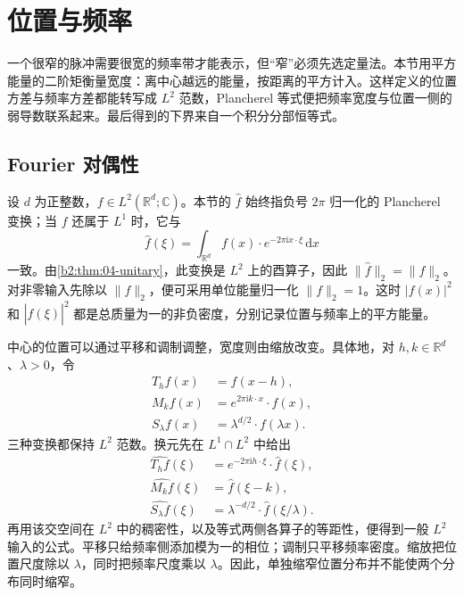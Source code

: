 \section{位置与频率}
\label{b2:sec:2001}

一个很窄的脉冲需要很宽的频率带才能表示，但“窄”必须先选定量法。本节用平方能量的二阶矩衡量宽度：离中心越远的能量，按距离的平方计入。这样定义的位置方差与频率方差都能转写成 \(L^2\) 范数，Plancherel 等式便把频率宽度与位置一侧的弱导数联系起来。最后得到的下界来自一个积分分部恒等式。

\subsection{Fourier 对偶性}
\label{b2:subsec:200101}

设 \(d\) 为正整数，\(f\in L^2(\mathbb R^d;\mathbb C)\)。本节的 \(\widehat f\) 始终指负号 \(2\pi\) 归一化的 Plancherel 变换；当 \(f\) 还属于 \(L^1\) 时，它与
\[
 \widehat f(\xi)
 =\int_{\mathbb R^d}f(x)\cdot e^{-2\pi\mathrm i x\cdot\xi}\,\mathrm dx
\]
一致。由\cref{b2:thm:04-unitary}，此变换是 \(L^2\) 上的酉算子，因此 \(\|\widehat f\|_2=\|f\|_2\)。对非零输入先除以 \(\|f\|_2\)，便可采用单位能量归一化 \(\|f\|_2=1\)。这时 \(|f(x)|^2\) 和 \(|\widehat f(\xi)|^2\) 都是总质量为一的非负密度，分别记录位置与频率上的平方能量。

\ProseParagraphBreak

中心的位置可以通过平移和调制调整，宽度则由缩放改变。具体地，对 \(h,k\in\mathbb R^d\)、\(\lambda>0\)，令
\[
 \begin{aligned}
 T_hf(x)&=f(x-h),\\
 M_kf(x)&=e^{2\pi\mathrm i k\cdot x}\cdot f(x),\\
 S_\lambda f(x)&=\lambda^{d/2}\cdot f(\lambda x).
 \end{aligned}
\]
三种变换都保持 \(L^2\) 范数。换元先在 \(L^1\cap L^2\) 中给出
\[
 \begin{aligned}
 \widehat{T_hf}(\xi)&=e^{-2\pi\mathrm i h\cdot\xi}\cdot\widehat f(\xi),\\
 \widehat{M_kf}(\xi)&=\widehat f(\xi-k),\\
 \widehat{S_\lambda f}(\xi)&=\lambda^{-d/2}\cdot\widehat f(\xi/\lambda).
 \end{aligned}
\]
再用该交空间在 \(L^2\) 中的稠密性，以及等式两侧各算子的等距性，便得到一般 \(L^2\) 输入的公式。平移只给频率侧添加模为一的相位；调制只平移频率密度。缩放把位置尺度除以 \(\lambda\)，同时把频率尺度乘以 \(\lambda\)。因此，单独缩窄位置分布并不能使两个分布同时缩窄。

